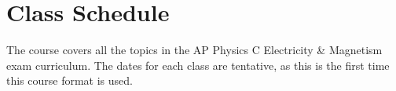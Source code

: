 \documentclass{../../oss-handout}
\begin{document}


\section{Class Schedule}
The course covers all the topics in the AP Physics C Electricity \& Magnetism
exam curriculum. The dates for each class are tentative, as this is the first
time this course format is used.
\end{document}
